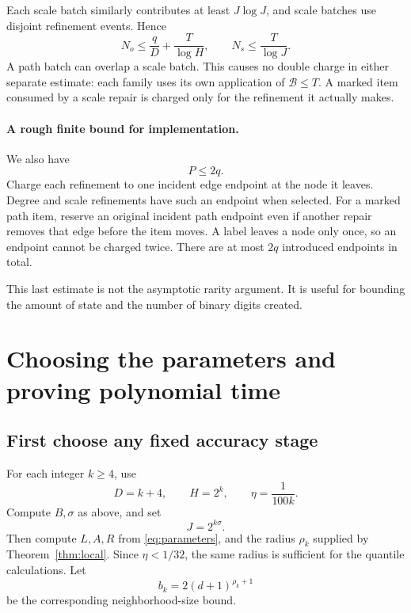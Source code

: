 Each scale batch similarly contributes at least \(J\log J\), and scale batches use disjoint refinement events. Hence
\begin{equation}\label{eq:rarity}
\boxed{
N_o\le\frac qD+\frac T{\log H},
\qquad
N_s\le\frac T{\log J}.
}
\end{equation}
A path batch can overlap a scale batch. This causes no double charge in either separate estimate: each family uses its own application of \(\mathcal B\le T\). A marked item consumed by a scale repair is charged only for the refinement it actually makes.

\paragraph{A rough finite bound for implementation.}
We also have
\begin{equation}\label{eq:incidence}
P\le2q.
\end{equation}
Charge each refinement to one incident edge endpoint at the node it leaves. Degree and scale refinements have such an endpoint when selected. For a marked path item, reserve an original incident path endpoint even if another repair removes that edge before the item moves. A label leaves a node only once, so an endpoint cannot be charged twice. There are at most \(2q\) introduced endpoints in total.

This last estimate is not the asymptotic rarity argument. It is useful for bounding the amount of state and the number of binary digits created.

\section{Choosing the parameters and proving polynomial time}\label{sec:runtime}

\subsection{First choose any fixed accuracy stage}

For each integer \(k\ge4\), use
\[
D=k+4,\qquad H=2^k,\qquad \eta=\frac1{100k}.
\]
Compute \(B,\sigma\) as above, and set
\[
J=2^{k\sigma}.
\]
Then compute \(L,A,R\) from \eqref{eq:parameters}, and the radius \(\rho_k\) supplied by Theorem~\ref{thm:local}. Since \(\eta<1/32\), the same radius is sufficient for the quantile calculations. Let
\[
b_k=2(d+1)^{\rho_k+1}
\]
be the corresponding neighborhood-size bound.

